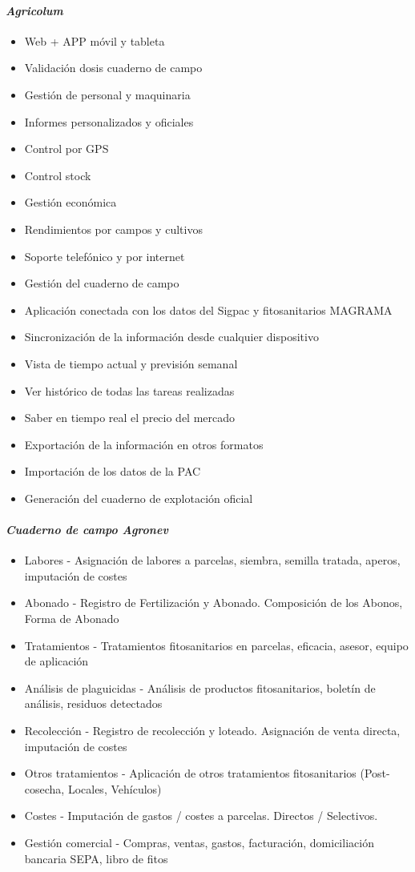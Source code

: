 \paragraph*{\textit{Agricolum}} \cite{agricolum}
\begin{itemize}
\item Web + APP móvil y tableta
\item Validación dosis cuaderno de campo
\item Gestión de personal y maquinaria
\item Informes personalizados y oficiales
\item Control por GPS
\item Control stock
\item Gestión económica
\item Rendimientos por campos y cultivos
\item Soporte telefónico y por internet
\item Gestión del cuaderno de campo
\item Aplicación conectada con los datos del Sigpac y fitosanitarios MAGRAMA
\item Sincronización de la información desde cualquier dispositivo
\item Vista de tiempo actual y previsión semanal
\item Ver histórico de todas las tareas realizadas
\item Saber en tiempo real el precio del mercado
\item Exportación de la información en otros formatos
\item Importación de los datos de la PAC
\item Generación del cuaderno de explotación oficial
\end{itemize}
\paragraph*{\textit{Cuaderno de campo Agronev}} \cite{agronev}
\begin{itemize}
\item Labores - Asignación de labores a parcelas, siembra, semilla tratada, aperos, imputación de costes
\item Abonado - Registro de Fertilización y Abonado. Composición de los Abonos, Forma de Abonado
\item Tratamientos - Tratamientos fitosanitarios en parcelas, eficacia, asesor, equipo de aplicación
\item Análisis de plaguicidas - Análisis de productos fitosanitarios, boletín de análisis, residuos detectados
\item Recolección - Registro de recolección y loteado. Asignación de venta directa, imputación de costes
\item Otros tratamientos - Aplicación de otros tratamientos fitosanitarios (Post-cosecha, Locales, Vehículos)
\item Costes - Imputación de gastos / costes a parcelas. Directos / Selectivos.
\item Gestión comercial - Compras, ventas, gastos, facturación, domiciliación bancaria SEPA, libro de fitos 
\end{itemize}


